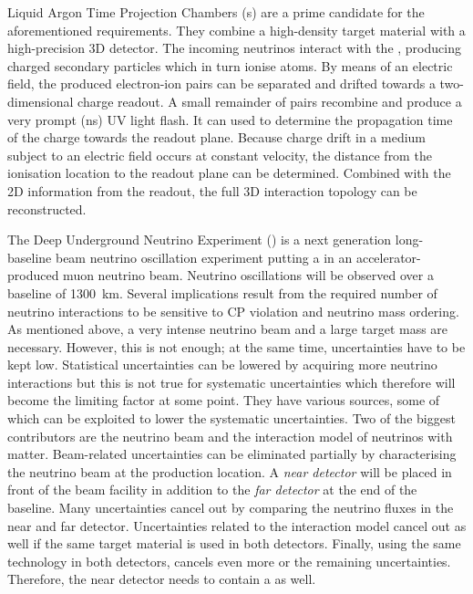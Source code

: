 Liquid Argon Time Projection Chambers (\lartpc{}s) are a prime candidate for the aforementioned requirements.
They combine a high-density target material with a high-precision 3D detector.
The incoming neutrinos interact with the \lar{}, producing charged secondary particles which in turn ionise  atoms.
By means of an electric field, the produced electron-ion pairs can be separated and drifted towards a two-dimensional charge readout.
A small remainder of pairs recombine and produce a very prompt (\si{\nano\second}) UV light flash.
It can used to determine the propagation time of the charge towards the readout plane.
Because charge drift in a medium subject to an electric field occurs at constant velocity, the distance from the ionisation location to the readout plane can be determined.
Combined with the 2D information from the readout, the full 3D interaction topology can be reconstructed.

The Deep Underground Neutrino Experiment (\dune{}) is a next generation long-baseline beam neutrino oscillation experiment putting a \lartpc{} in an accelerator-produced muon neutrino beam.
Neutrino oscillations will be observed over a baseline of \SI{1300}{\kilo\metre}.
Several implications result from the required number of neutrino interactions to be sensitive to CP violation and neutrino mass ordering.
As mentioned above, a very intense neutrino beam and a large target mass are necessary.
However, this is not enough; at the same time, uncertainties have to be kept low.
Statistical uncertainties can be lowered by acquiring more neutrino interactions but this is not true for systematic uncertainties which therefore will become the limiting factor at some point.
They have various sources, some of which can be exploited to lower the systematic uncertainties.
Two of the biggest contributors are the neutrino beam and the interaction model of neutrinos with matter.
Beam-related uncertainties can be eliminated partially by characterising the neutrino beam at the production location.
A \emph{near detector} will be placed in front of the beam facility in addition to the \emph{far detector} at the end of the baseline.
Many uncertainties cancel out by comparing the neutrino fluxes in the near and far detector.
Uncertainties related to the interaction model cancel out as well if the same target material is used in both detectors.
Finally, using the same technology in both detectors, cancels even more or the remaining uncertainties.
Therefore, the near detector needs to contain a \lartpc{} as well.

